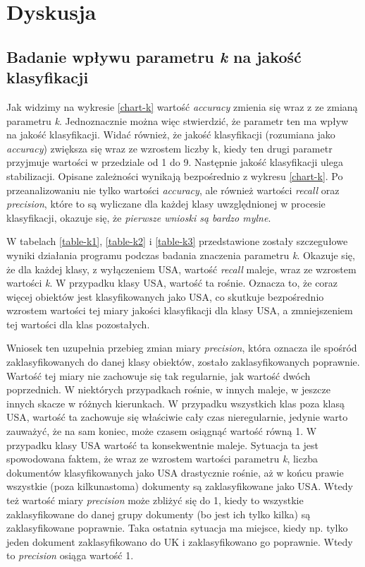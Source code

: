 \documentclass{classrep}
\begin{document}
    \section{Dyskusja} {

        \subsection{Badanie wpływu parametru \emph{k} na jakość klasyfikacji} {
            Jak widzimy na wykresie \ref{chart-k} wartość \emph{accuracy} zmienia się wraz z ze
            zmianą parametru \emph{k}. Jednoznacznie można więc stwierdzić, że parametr ten ma wpływ
            na jakość klasyfikacji. Widać również, że jakość klasyfikacji (rozumiana jako
            \emph{accuracy}) zwiększa się wraz ze wzrostem liczby k, kiedy ten drugi parametr
            przyjmuje wartości w przedziale od 1 do 9. Następnie jakość klasyfikacji ulega
            stabilizacji. Opisane zależności wynikają bezpośrednio z wykresu \ref{chart-k}. Po
            przeanalizowaniu nie tylko wartości \emph{accuracy}, ale również wartości \emph{recall}
            oraz \emph{precision}, które to są wyliczane dla każdej klasy uwzględnionej w procesie
            klasyfikacji, okazuje się, że \emph{pierwsze wnioski są bardzo mylne}.

            W tabelach \ref{table-k1}, \ref{table-k2} i \ref{table-k3} przedstawione zostały
            szczegułowe wyniki działania programu podczas badania znaczenia parametru \emph{k}.
            Okazuje się, że dla każdej klasy, z wyłączeniem USA, wartość \emph{recall} maleje, wraz
            ze wzrostem wartości \emph{k}. W przypadku klasy USA, wartość ta rośnie. Oznacza to, że
            coraz więcej obiektów jest klasyfikowanych jako USA, co skutkuje bezpośrednio wzrostem
            wartości tej miary jakości klasyfikacji dla klasy USA, a zmniejszeniem tej wartości dla
            klas pozostałych.

            Wniosek ten uzupełnia przebieg zmian miary \emph{precision}, która oznacza ile spośród
            zaklasyfikowanych do danej klasy obiektów, zostało zaklasyfikowanych poprawnie. Wartość
            tej miary nie zachowuje się tak regularnie, jak wartość dwóch poprzednich. W niektórych
            przypadkach rośnie, w innych maleje, w jeszcze innych skacze w różnych kierunkach. W
            przypadku wszystkich klas poza klasą USA, wartość ta zachowuje się właściwie cały czas
            nieregularnie, jedynie warto zauważyć, że na sam koniec, może czasem osiągnąć wartość
            równą 1.  W przypadku klasy USA wartość ta konsekwentnie maleje. Sytuacja ta jest
            spowodowana faktem, że wraz ze wzrostem wartości parametru \emph{k}, liczba dokumentów
            klasyfikowanych jako USA drastycznie rośnie, aż w końcu prawie wszystkie (poza
            kilkunastoma) dokumenty są zaklasyfikowane jako USA. Wtedy też wartość miary
            \emph{precision} może zbliżyć się do 1, kiedy to wszystkie zaklasyfikowane do danej
            grupy dokumenty (bo jest ich tylko kilka) są zaklasyfikowane poprawnie. Taka ostatnia
            sytuacja ma miejsce, kiedy np. tylko jeden dokument zaklasyfikowano do UK i
            zaklasyfikowano go poprawnie. Wtedy to \emph{precision} osiąga wartość 1.

}}
\end{document}
